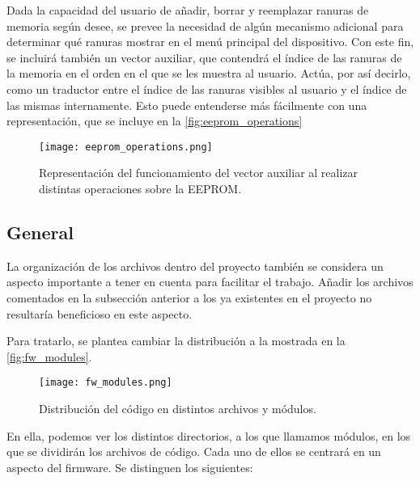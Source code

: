 Dada la capacidad del usuario de añadir, borrar y reemplazar ranuras de memoria según desee, se prevee la necesidad de algún mecanismo adicional para determinar qué ranuras mostrar en el menú principal del dispositivo. Con este fin, se incluirá también un vector auxiliar, que contendrá el índice de las ranuras de la memoria en el orden en el que se les muestra al usuario. Actúa, por así decirlo, como un traductor entre el índice de las ranuras visibles al usuario y el índice de las mismas internamente. Esto puede entenderse más fácilmente con una representación, que se incluye en la \autoref{fig:eeprom_operations}

\begin{figure}[h]
    \centering
    \texttt{[image: eeprom\_operations.png]}
    \caption{Representación del funcionamiento del vector auxiliar al realizar distintas operaciones sobre la EEPROM.}
    \label{fig:eeprom_operations}
\end{figure}

\subsection{General}

La organización de los archivos dentro del proyecto también se considera un aspecto importante a tener en cuenta para facilitar el trabajo. Añadir los archivos comentados en la subsección anterior a los ya existentes en el proyecto no resultaría beneficioso en este aspecto.

Para tratarlo, se plantea cambiar la distribución a la mostrada en la \autoref{fig:fw_modules}.

\begin{figure}[ht]
    \centering
	\texttt{[image: fw\_modules.png]}
	\caption{Distribución del código en distintos archivos y módulos.}
    \label{fig:fw_modules}
\end{figure}

En ella, podemos ver los distintos directorios, a los que llamamos módulos, en los que se dividirán los archivos de código. Cada uno de ellos se centrará en un aspecto del firmware. Se distinguen los siguientes:

